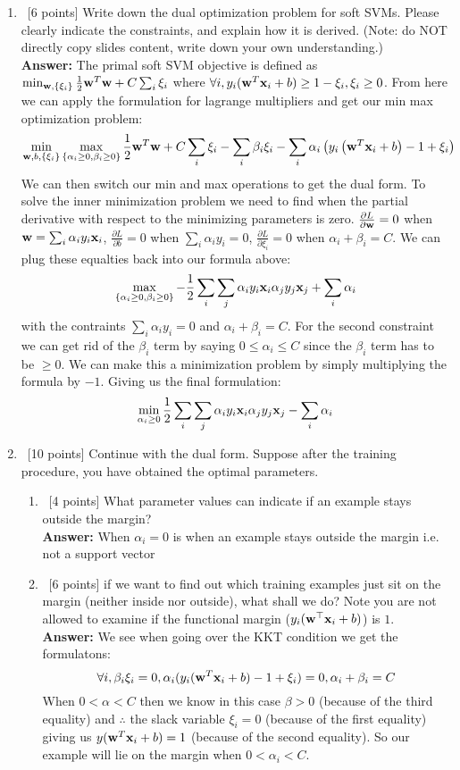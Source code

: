 \documentclass[12pt, fullpage,letterpaper]{article}
\newcommand{\Answer}{{\\\textbf{Answer: }}}
\begin{document}
\begin{enumerate}
	
	\item~[6 points] Write down the dual optimization problem for soft SVMs.  
	Please clearly indicate the constraints, and explain how it is derived. (Note: do NOT directly copy slides content, write down your own understanding.)
	\Answer The primal soft SVM objective is defined as $\min_{{\bf w}, \{\xi_i\}} \frac{1}{2}{\bf w}^T{\bf w} + C \sum_i \xi_i$ where $\forall i, y_i({\bf w}^T {\bf x}_i + b) \geq 1 - \xi_i, \xi_i \geq 0$.  From here we can apply the formulation for lagrange multipliers and get our min max optimization problem:
	\[\min_{{\bf w}, b, \{\xi_i\}} \max_{\{\alpha_i \geq 0, \beta_i \geq 0\}} \frac{1}{2} {\bf w}^T {\bf w} + C \sum_i \xi_i - \sum_i \beta_i \xi_i - \sum_i \alpha_i \left(y_i \left({\bf w}^T {\bf x}_i + b\right) - 1 + \xi_i\right) \]
	We can then switch our min and max operations to get the dual form. To solve the inner minimization problem we need to find when the partial derivative with respect to the minimizing parameters is zero. $\frac{\partial L}{\partial {\bf w}} = 0$ when ${\bf w} = \sum_i \alpha_i y_i {\bf x}_i$, $\frac{\partial L}{\partial b} = 0$ when $\sum_i \alpha_i y_i = 0$, $\frac{\partial L}{\partial \xi_i} = 0$ when $\alpha_i + \beta_i = C$. We can plug these equalties back into our formula above:
	\[\max_{\{\alpha_i \geq 0, \beta_i \geq 0\}} -\frac{1}{2} \sum_i \sum_j \alpha_i y_i {\bf x}_i \alpha_j y_j {\bf x}_j + \sum_i \alpha_i\]
	with the contraints $\sum_i \alpha_i y_i = 0$ and $\alpha_i + \beta_i = C$.  For the second constraint we can get rid of the $\beta_i$ term by saying $0 \leq \alpha_i \leq C$ since the $\beta_i$ term has to be $\geq 0$.  We can make this a minimization problem by simply multiplying the formula by $-1$. Giving us the final formulation:
	\[\min_{\alpha_i \geq 0} \frac{1}{2} \sum_i \sum_j \alpha_i y_i {\bf x}_i \alpha_j y_j {\bf x}_j - \sum_i \alpha_i\]
	
	\item~[10 points] Continue with the dual form. Suppose after the training procedure, you have obtained the optimal parameters.
	\begin{enumerate}
		\item~[4 points] What parameter values can indicate if an example stays outside the margin?
		\Answer When $\alpha_i = 0$ is when an example stays outside the margin i.e. not a support vector
		\item~[6 points]  if we want to find out which training examples just sit on the margin (neither inside nor outside), what shall we do? Note you are not allowed to examine if the functional margin (\ie $y_i({\bf w}^\top{\bf x}_i +b)$) is $1$.
		\Answer We see when going over the KKT condition we get the formulatons:
		\[\forall i, \beta_i \xi_i = 0, \alpha_i(y_i({\bf w}^T {\bf x}_i + b) - 1 + \xi_i) = 0, \alpha_i + \beta_i = C\]
		When $0 < \alpha < C$ then we know in this case $\beta > 0$ (because of the third equality) and $\therefore$ the slack variable $\xi_i = 0 $ (because of the first equality) giving us $y({\bf w}^T {\bf x}_i + b) = 1$ (because of the second equality).  So our example will lie on the margin when $0 < \alpha_i < C$.
	\end{enumerate}
	

\end{enumerate}
\end{document}
